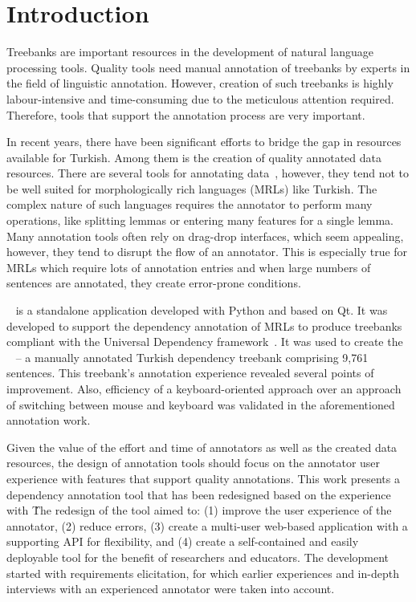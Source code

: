 \section{Introduction}
\label{sec:introduction}

Treebanks are important resources in the development of natural language processing tools.
Quality tools need manual annotation of treebanks by experts in the field of linguistic annotation.
However, creation of such treebanks is highly labour-intensive and time-consuming due to the meticulous attention required.
Therefore, tools that support the annotation process are very important.

In recent years, there have been significant efforts to bridge the gap in resources available for Turkish.
Among them is the creation of quality annotated data resources.
There are several tools for annotating data~\cite{brat,dgannotator}, however, they tend not to be well suited for morphologically rich languages (MRLs) like Turkish.
The complex nature of such languages requires the annotator to perform many operations, like splitting lemmas or entering many features for a single lemma.
Many annotation tools often rely on drag-drop interfaces, which seem appealing, however, they tend to disrupt the flow of an annotator.
This is especially true for MRLs which require lots of annotation entries and when large numbers of sentences are annotated, they create error-prone conditions. %

\boatvone~\cite{trk2020resources} is a standalone application developed with Python and based on Qt.
It was developed to support the dependency annotation of MRLs to produce treebanks compliant with the Universal Dependency framework~\cite{UD}.
It was used to create the \bountreebank~\cite{turk-etal-2019-turkish,trk2020resources,UD-Boun-Treebank} -- a manually annotated Turkish dependency treebank comprising 9,761 sentences.
This treebank's annotation experience revealed several points of improvement.
Also, efficiency of a keyboard-oriented approach over an approach of switching between mouse and keyboard was validated in the aforementioned annotation work.

Given the value of the effort and time of annotators as well as the created data resources, the design of annotation tools should focus on the annotator user experience with features that support quality annotations.
This work presents a dependency annotation tool that has been redesigned based on the experience with \boatvone\.
The redesign of the tool aimed to: (1) improve the user experience of the annotator, (2) reduce errors, (3) create a multi-user web-based application with a supporting API for flexibility, and (4) create a self-contained and easily deployable tool for the benefit of researchers and educators.
The development started with requirements elicitation, for which earlier experiences and in-depth interviews with an experienced annotator were taken into account.

